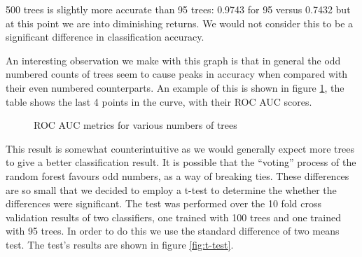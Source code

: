 \documentclass[ %
                    author={Sam Phippen},
                supervisor={Dr. Rafal Bogacz},
                     title={Real time voice activity detectors in noisy personal computing environments},
                  subtitle={},
                    degree={MEng},
                      year={2012} ]{thesis}
\begin{document}
500 trees is slightly more accurate than 95 trees: 0.9743 for 95 versus
0.7432 but at this point we are into diminishing returns. We would not consider
this to be a significant difference in classification accuracy.

An interesting observation we make with this graph is that in general the odd
numbered counts of trees seem to cause peaks in accuracy when compared with
their even numbered counterparts. An example of this is shown in figure
\ref{table:roc_spike}, the table shows the last 4 points in the curve, with
their ROC AUC scores.

\begin{figure}
    \caption{ROC AUC metrics for various numbers of trees}
    \label{table:roc_spike}
\end{figure}

This result is somewhat counterintuitive as we would generally expect more
trees to give a better classification result. It is possible that the
``voting'' process of the random forest favours odd numbers, as a way of
breaking ties.  These differences are so small that we decided to employ a
t-test to determine the whether the differences were significant. The test was
performed over the 10 fold cross validation results of two classifiers, one
trained with 100 trees and one trained with 95 trees. In order to do this we
use the standard difference of two means test. The test's results are shown in
figure \ref{fig:t-test}.
\end{document}
